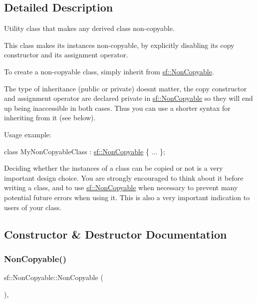 \subsection{Detailed Description}
Utility class that makes any derived class non-\/copyable. 

This class makes its instances non-\/copyable, by explicitly disabling its copy constructor and its assignment operator.

To create a non-\/copyable class, simply inherit from \hyperlink{classsf_1_1_non_copyable}{sf\+::\+Non\+Copyable}.

The type of inheritance (public or private) doesn\textquotesingle{}t matter, the copy constructor and assignment operator are declared private in \hyperlink{classsf_1_1_non_copyable}{sf\+::\+Non\+Copyable} so they will end up being inaccessible in both cases. Thus you can use a shorter syntax for inheriting from it (see below).

Usage example\+: 
\begin{DoxyCode}
\textcolor{keyword}{class }MyNonCopyableClass : \hyperlink{classsf_1_1_non_copyable}{sf::NonCopyable}
\{
    ...
\};
\end{DoxyCode}


Deciding whether the instances of a class can be copied or not is a very important design choice. You are strongly encouraged to think about it before writing a class, and to use \hyperlink{classsf_1_1_non_copyable}{sf\+::\+Non\+Copyable} when necessary to prevent many potential future errors when using it. This is also a very important indication to users of your class. 

\subsection{Constructor \& Destructor Documentation}
\mbox{\label{classsf_1_1_non_copyable_a2110add170580fdb946f887719da6860}} 
\subsubsection{\texorpdfstring{Non\+Copyable()}{NonCopyable()}}
{\footnotesize\ttfamily sf\+::\+Non\+Copyable\+::\+Non\+Copyable (\begin{DoxyParamCaption}{ }\end{DoxyParamCaption})\hspace{0.3cm}{\ttfamily [inline]}, {\ttfamily [protected]}}



